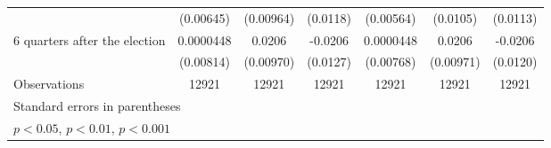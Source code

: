 \begin{table}[!ht]
\begin{tabular}{l*{6}{c}}
                    &   (0.00645)         &   (0.00964)         &    (0.0118)         &   (0.00564)         &    (0.0105)         &    (0.0113)         \\
[1em]
 6 quarters after the election&   0.0000448         &      0.0206\sym{*}  &     -0.0206         &   0.0000448         &      0.0206\sym{*}  &     -0.0206         \\
                    &   (0.00814)         &   (0.00970)         &    (0.0127)         &   (0.00768)         &   (0.00971)         &    (0.0120)         \\
\hline
Observations        &       12921         &       12921         &       12921         &       12921         &       12921         &       12921         \\
\hline\hline
\multicolumn{7}{l}{\footnotesize Standard errors in parentheses}\\
\multicolumn{7}{l}{\footnotesize \sym{*} \(p<0.05\), \sym{**} \(p<0.01\), \sym{***} \(p<0.001\)}\\
\end{tabular}
\end{table}
